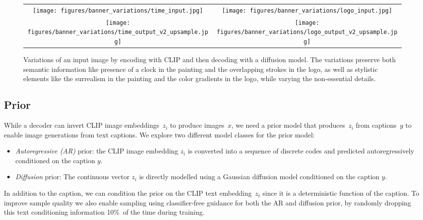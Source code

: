 \documentclass{article}
\begin{document}
\begin{figure*}[t!]
    \centering
    \setlength{\tabcolsep}{2.0pt}
    \begin{tabular}{cc}
        \texttt{[image: figures/banner\_variations/time\_input.jpg]} & 
        \texttt{[image: figures/banner\_variations/logo\_input.jpg]} 
        \rule{0pt}{0.0pt} \\
        \texttt{[image: figures/banner\_variations/time\_output\_v2\_upsample.jpg]} &
        \texttt{[image: figures/banner\_variations/logo\_output\_v2\_upsample.jpg]} 
        \rule{0pt}{0.5pt}
    \end{tabular}

    \caption{Variations of an input image by encoding with CLIP and then decoding with a diffusion model. The variations preserve both semantic information like presence of a clock in the painting and the overlapping strokes in the logo, as well as stylistic elements like the surrealism in the painting and the color gradients in the logo, while varying the non-essential details.}
    \label{fig:variations_examples}
    \vskip -0.1in 
\end{figure*}

\subsection{Prior}
While a decoder can invert CLIP image embeddings~$z_i$ to produce images~$x$, we need a prior model that produces~$z_i$ from captions~$y$ to enable image generations from text captions. We explore two different model classes for the prior model:

\begin{itemize}
    \item \textit{Autoregressive (AR)} prior: the CLIP image embedding $z_i$ is converted into a sequence of discrete codes and predicted autoregressively conditioned on the caption $y$.
    \item \textit{Diffusion} prior: The continuous vector $z_i$ is directly modelled using a Gaussian diffusion model conditioned on the caption $y$.
\end{itemize}

In addition to the caption, we can condition the prior on the CLIP text embedding~$z_t$ since it is a deterministic function of the caption. To improve sample quality we also enable sampling using classifier-free guidance for both the AR and diffusion prior, by randomly dropping this text conditioning information 10\%~of the time during training.
\end{document}
